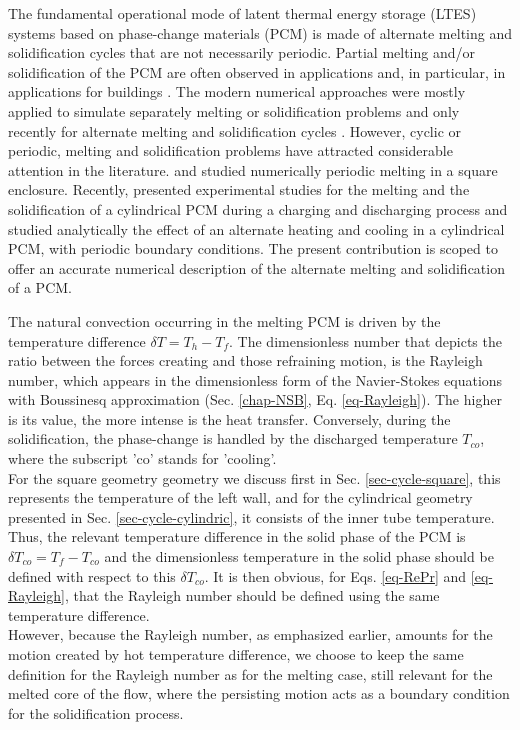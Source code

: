 The fundamental operational mode of latent thermal energy storage (LTES) systems based on phase-change materials (PCM) is made of alternate melting and solidification cycles that  are not necessarily periodic. Partial melting and/or solidification of the PCM are often observed in applications and, in particular, in applications for buildings \citep{zhu2009dynamic,ascione2014energy}. 
The modern numerical approaches were mostly applied to simulate separately melting or solidification problems and only recently for alternate melting and solidification cycles \citep{wang2010numerical}. However, cyclic or periodic, melting and solidification problems have attracted considerable attention in the literature. \cite{ho1993periodic} and \cite{voller1996cyclic} studied numerically periodic melting in a square enclosure. Recently, \cite{hosseini2014experimental} presented experimental studies for the melting and the solidification of a cylindrical PCM during a charging and discharging process and \cite{chabot2017solid} studied analytically the effect of an alternate heating and cooling in a cylindrical PCM, with periodic boundary conditions. 
The present contribution is scoped  to offer an accurate numerical description of the alternate melting and solidification of a PCM.

The natural convection occurring in the melting PCM is driven by the temperature difference $\delta T = T_h - T_f$. 
The dimensionless number that depicts the ratio between the forces creating and those refraining motion, is the Rayleigh number, which appears in the dimensionless form of the Navier-Stokes equations with Boussinesq approximation (Sec. \ref{chap-NSB}, Eq. \ref{eq-Rayleigh}). 
The higher is its value, the more intense is the heat transfer.
Conversely, during the solidification, the phase-change is handled by the discharged temperature $T_{co}$, where the subscript 'co' stands for 'cooling'. \\
For the square geometry geometry we discuss first in Sec. \ref{sec-cycle-square}, this represents the temperature of the left wall, 
and for the cylindrical geometry presented in Sec. \ref{sec-cycle-cylindric}, it consists of the inner tube temperature.
Thus, the relevant temperature difference in the solid phase of the PCM is $\delta T_{co} = T_f-T_{co}$ and the dimensionless temperature in the solid phase should be defined with respect to this $\delta T_{co}$. 
It is then obvious, for Eqs. \ref{eq-RePr} and \ref{eq-Rayleigh},  that the Rayleigh number should be defined using the same temperature difference.  \\
However, because the Rayleigh number, as emphasized earlier, amounts for the motion created by hot temperature difference, we choose to keep the same definition for the Rayleigh number as for the melting case, still relevant for the melted core of the flow, where the persisting motion acts as a boundary condition for the solidification process.    

